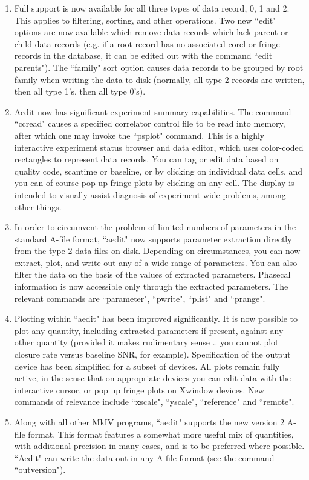 \begin{enumerate}
\item Full support is now available for all three types of data record,
0, 1 and 2.  This applies to filtering, sorting, and other operations.
Two new ``edit" options are now available which remove data records
which lack parent or child data records (e.g. if a root record has no
associated corel or fringe records in the database, it can be edited
out with the command ``edit parents").  The ``family" sort option causes
data records to be grouped by root family when writing the data to disk
(normally, all type 2 records are written, then all type 1's, then all
type 0's).
\item Aedit now has significant experiment summary capabilities.  The
command ``ccread" causes a specified correlator control file to be read
into memory, after which one may invoke the ``psplot" command.  This is
a highly interactive experiment status browser and data editor, which
uses color-coded rectangles to represent data records.  You can tag or
edit data based on quality code, scantime or baseline, or by clicking on
individual data cells, and you can of course pop up fringe plots by 
clicking on any cell.  The display is intended to visually assist 
diagnosis of experiment-wide problems, among other things.
\item In order to circumvent the problem of limited numbers of parameters
in the standard A-file format, ``aedit" now supports parameter extraction
directly from the type-2 data files on disk.  Depending on circumstances,
you can now extract, plot, and write out any of a wide range of parameters.
You can also filter the data on the basis of the values of extracted parameters.
Phasecal information is now accessible only through the extracted
parameters.  The relevant commands are ``parameter", ``pwrite", ``plist"
and ``prange".
\item Plotting within ``aedit" has been improved significantly.  It is now
possible to plot any quantity, including extracted parameters if present,
against any other quantity (provided it makes rudimentary sense .. you
cannot plot closure rate versus baseline SNR, for example).  Specification
of the output device has been simplified for a subset of devices.  All
plots remain fully active, in the sense that on appropriate devices you can
edit data with the interactive cursor, or pop up fringe plots on Xwindow
devices.  New commands of relevance include ``xscale", ``yscale", ``reference"
and ``remote".
\item Along with all other MkIV programs, ``aedit" supports the new version 2
A-file format.  This format features a somewhat more useful mix of quantities,
with additional precision in many cases, and is to be preferred where
possible.  ``Aedit" can write the data out in any A-file format (see the
command ``outversion").
\end{enumerate}

